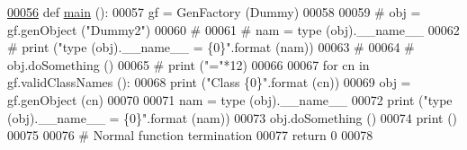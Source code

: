 \begin{DoxyCode}
\hypertarget{namespacegen__factory.tex_l00056}{}\hyperlink{namespacegen__factory_a785bd40533dd477ffff224d65ba1c5c3}{00056} \textcolor{keyword}{def }\hyperlink{namespacegen__factory_a785bd40533dd477ffff224d65ba1c5c3}{main} ():
00057     gf = GenFactory (Dummy)
00058     
00059 \textcolor{comment}{#    obj = gf.genObject ("Dummy2")}
00060 \textcolor{comment}{#    }
00061 \textcolor{comment}{#    nam = type (obj).\_\_name\_\_ }
00062 \textcolor{comment}{#    print ("type (obj).\_\_name\_\_ = \{0\}".format (nam))}
00063 \textcolor{comment}{#    }
00064 \textcolor{comment}{#    obj.doSomething ()}
00065 \textcolor{comment}{#    print ("="*12)}
00066     
00067     \textcolor{keywordflow}{for} cn \textcolor{keywordflow}{in} gf.validClassNames ():
00068         \textcolor{keywordflow}{print} (\textcolor{stringliteral}{"Class \{0\}"}.format (cn))
00069         obj = gf.genObject (cn)
00070     
00071         nam = type (obj).\_\_name\_\_ 
00072         \textcolor{keywordflow}{print} (\textcolor{stringliteral}{"type (obj).\_\_name\_\_ = \{0\}"}.format (nam))
00073         obj.doSomething ()
00074         \textcolor{keywordflow}{print} ()
00075         
00076     \textcolor{comment}{# Normal function termination}
00077     \textcolor{keywordflow}{return} 0
00078 
\end{DoxyCode}
